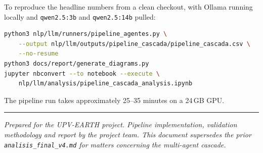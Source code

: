 \documentclass[11pt,a4paper]{article}
\begin{document}
To reproduce the headline numbers from a clean checkout, with Ollama running locally and \texttt{qwen2.5:3b} and \texttt{qwen2.5:14b} pulled:

\begin{lstlisting}[language=bash,caption={Reproducing all headline results}]
python3 nlp/llm/runners/pipeline_agentes.py \
    --output nlp/llm/outputs/pipeline_cascada/pipeline_cascada.csv \
    --no-resume
python3 docs/report/generate_diagrams.py
jupyter nbconvert --to notebook --execute \
    nlp/llm/analysis/pipeline_cascada_analysis.ipynb
\end{lstlisting}

The pipeline run takes approximately 25--35 minutes on a 24\,GB GPU.

\bigskip
\hrule
\medskip
\noindent\emph{Prepared for the UPV-EARTH project. Pipeline implementation, validation methodology and report by the project team. This document supersedes the prior \texttt{analisis\_final\_v4.md} for matters concerning the multi-agent cascade.}
\end{document}
